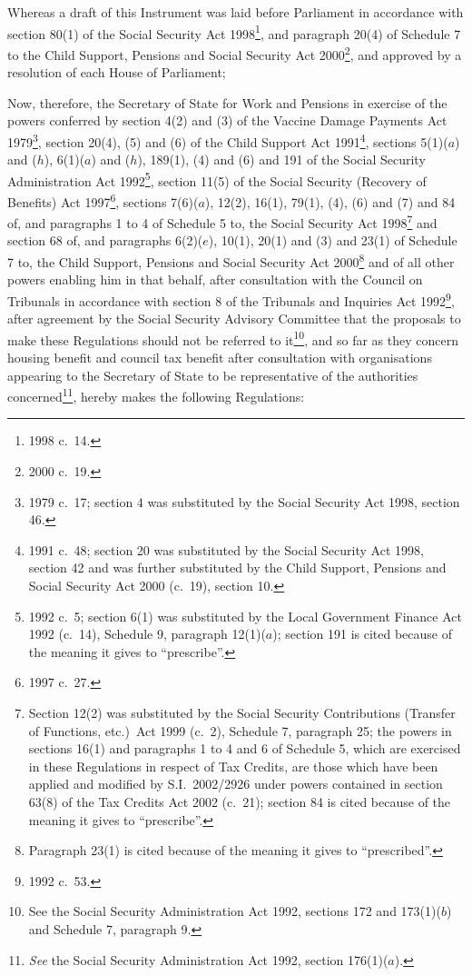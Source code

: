 \documentclass[12pt,a4paper]{article}
\title{\regstitle}
\author{S.I.\ 2004 No.\ 3368}
\date{Made
20th December 2004\\
Coming into force
in accordance with regulation 1
}
\begin{document}
\maketitle

\noindent
Whereas a draft of this Instrument was laid before Parliament in accordance with section 80(1) of the Social Security Act 1998\footnote{1998 c.\ 14.}, and paragraph 20(4) of Schedule 7 to the Child Support, Pensions and Social Security Act 2000\footnote{2000 c.\ 19.}, and approved by a resolution of each House of Parliament;

Now, therefore, the Secretary of State for Work and Pensions in exercise of the powers conferred by section 4(2) and (3) of the Vaccine Damage Payments Act 1979\footnote{1979 c.\ 17; section 4 was substituted by the Social Security Act 1998, section 46.}, section 20(4), (5) and (6) of the Child Support Act 1991\footnote{1991 c.\ 48; section 20 was substituted by the Social Security Act 1998, section 42 and was further substituted by the Child Support, Pensions and Social Security Act 2000 (c.\ 19), section 10.}, sections 5(1)($a$)  and ($h$), 6(1)($a$)  and ($h$), 189(1), (4) and (6) and 191 of the Social Security Administration Act 1992\footnote{1992 c.\ 5; section 6(1) was substituted by the Local Government Finance Act 1992 (c.\ 14), Schedule 9, paragraph 12(1)($a$); section 191 is cited because of the meaning it gives to “prescribe”.}, section 11(5) of the Social Security (Recovery of Benefits) Act 1997\footnote{1997 c.\ 27.}, sections 7(6)($a$), 12(2), 16(1), 79(1), (4), (6) and (7) and 84 of, and paragraphs 1 to 4 of Schedule 5 to, the Social Security Act 1998\footnote{Section 12(2) was substituted by the Social Security Contributions (Transfer of Functions, etc.)\ Act 1999 (c.\ 2), Schedule 7, paragraph 25; the powers in sections 16(1) and paragraphs 1 to 4 and 6 of Schedule 5, which are exercised in these Regulations in respect of Tax Credits, are those which have been applied and modified by S.I.\ 2002/2926 under powers contained in section 63(8) of the Tax Credits Act 2002 (c.\ 21); section 84 is cited because of the meaning it gives to “prescribe”.} and section 68 of, and paragraphs 6(2)($e$), 10(1), 20(1) and (3) and 23(1) of Schedule 7 to, the Child Support, Pensions and Social Security Act 2000\footnote{Paragraph 23(1) is cited because of the meaning it gives to “prescribed”.} and of all other powers enabling him in that behalf, after consultation with the Council on Tribunals in accordance with section 8 of the Tribunals and Inquiries Act 1992\footnote{1992 c.\ 53.}, after agreement by the Social Security Advisory Committee that the proposals to make these Regulations should not be referred to it\footnote{See the Social Security Administration Act 1992, sections 172 and 173(1)($b$) and Schedule 7, paragraph 9.}, and so far as they concern housing benefit and council tax benefit after consultation with organisations appearing to the Secretary of State to be representative of the authorities concerned\footnote{\emph{See} the Social Security Administration Act 1992, section 176(1)($a$).}, hereby makes the following Regulations: 
\end{document}
